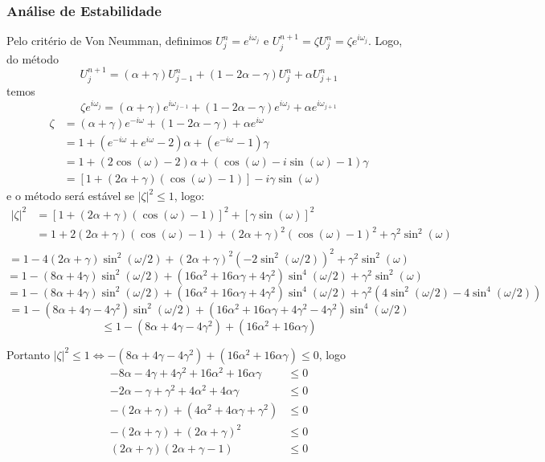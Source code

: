 \documentclass[12pt, a4paper]{article}
\begin{document}
    \subsubsection{Análise de Estabilidade}
    \label{sec:est}
    Pelo critério de Von Neumman, definimos $U_j^n = e^{i\omega_j}$ e $U_j^{n+1} = \zeta U_j^n = \zeta e^{i\omega_j}$. Logo, do método
    \[U_j^{n+1} = (\alpha+\gamma)U_{j-1}^n + (1-2\alpha-\gamma)U_j^n + \alpha U_{j+1}^n\]
    temos
    \[\zeta e^{i\omega_j} = (\alpha+\gamma) e^{i\omega_{j-1}} + (1-2\alpha-\gamma)e^{i\omega_j} + \alpha e^{i\omega_{j+1}}\]
    \[\begin{split}
        \zeta &= (\alpha+\gamma) e^{-i\omega} + (1-2\alpha-\gamma) + \alpha e^{i\omega}\\
        &= 1 + (e^{-i\omega}+e^{i\omega} - 2)\alpha + (e^{-i\omega} - 1)\gamma\\
        &= 1 + (2\cos(\omega) - 2)\alpha + (\cos(\omega)-i\sin(\omega) - 1)\gamma\\
        &= [1+(2\alpha+\gamma)(\cos(\omega)-1)] - i \gamma\sin(\omega)
    \end{split}\]
    e o método será estável se $|\zeta|^2 \leq 1$, logo:
    \[\begin{split}
        |\zeta|^2 &= {[1+(2\alpha+\gamma)(\cos(\omega)-1)]}^2 + {[\gamma\sin(\omega)]}^2\\
        &= 1 + 2(2\alpha+\gamma)(\cos(\omega)-1) + {(2\alpha+\gamma)}^2{(\cos(\omega)-1)}^2 + \gamma^2\sin^2(\omega)\\
    \end{split}\]
    \[= 1 - 4(2\alpha+\gamma)\sin^2(\omega/2) + {(2\alpha+\gamma)}^2{(-2\sin^2(\omega/2))}^2 + \gamma^2\sin^2(\omega)\]
    \[= 1 - (8\alpha+4\gamma)\sin^2(\omega/2) + (16\alpha^2+16\alpha\gamma+4\gamma^2)\sin^4(\omega/2) + \gamma^2\sin^2(\omega)\]
    \[= 1 - (8\alpha+4\gamma)\sin^2(\omega/2) + (16\alpha^2+16\alpha\gamma+4\gamma^2)\sin^4(\omega/2) + \gamma^2(4\sin^2(\omega/2)-4\sin^4(\omega/2))\]
    \[= 1 - (8\alpha+4\gamma-4\gamma^2)\sin^2(\omega/2) + (16\alpha^2+16\alpha\gamma+4\gamma^2-4\gamma^2)\sin^4(\omega/2)\]
    \[\leq 1 - (8\alpha+4\gamma-4\gamma^2) + (16\alpha^2+16\alpha\gamma)\]

    Portanto $|\zeta|^2 \leq 1 \iff - (8\alpha+4\gamma-4\gamma^2) + (16\alpha^2+16\alpha\gamma) \leq 0$, logo
    \[\begin{split}
        -8\alpha-4\gamma+4\gamma^2 + 16\alpha^2+16\alpha\gamma &\leq 0\\
        -2\alpha-\gamma+\gamma^2 + 4\alpha^2+4\alpha\gamma &\leq 0\\
        -(2\alpha+\gamma)+(4\alpha^2+4\alpha\gamma+\gamma^2) &\leq 0\\
        -(2\alpha+\gamma)+{(2\alpha+\gamma)}^2 &\leq 0\\
        (2\alpha+\gamma)(2\alpha+\gamma-1) &\leq 0\\
    \end{split}\]
\end{document}

